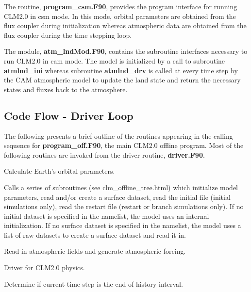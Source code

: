\documentclass[]{article}
\begin{document}
 The routine, {\bf program\_csm.F90},
provides the program interface for running CLM2.0 in csm mode. In this
mode, orbital parameters are obtained from the flux coupler during
initialization whereas atmospheric data are obtained from the flux
coupler during the time stepping loop.
\newline

 The module, {\bf atm\_lndMod.F90}, contains
the subroutine interfaces necessary to run CLM2.0 in cam mode. The
model is initialized by a call to subroutine {\bf atmlnd\_ini} whereas
subroutine {\bf atmlnd\_drv} is called at every time step by the
CAM atmospheric model to update the land state and return the 
necessary states and fluxes back to the atmosphere.
\newline

\subsection {Code Flow - Driver Loop}

\noindent 
The following presents a brief outline of the routines appearing in
the calling sequence for {\bf program\_off.F90}, the main CLM2.0 offline
program. Most of the following routines are invoked from the driver routine,
{\bf driver.F90}.

\medskip

Calculate Earth's orbital parameters. \newline

Calls a series of subroutines (see  {clm_offline_tree.html}) which
initialize model parameters, read and/or create a surface dataset,
read the initial file (initial simulations only), read the restart
file (restart or branch simulations only). If no initial dataset is
specified in the namelist, the model uses an internal
initialization. If no surface dataset is specified in the namelist,
the model uses a list of raw datasets to create a surface dataset and
read it in. \newline

Read in atmospheric fields and generate atmospheric forcing. \newline

Driver for CLM2.0 physics. \newline

Determine if current time step is the end of history interval. \newline
\end{document}
